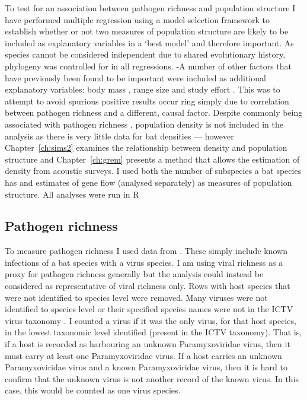 To test for an association between pathogen richness and population structure I have performed multiple regression using a model selection framework to establish whether or not two measures of population structure are likely to be included as explanatory variables in a `best model' and therefore important.
As species cannot be considered independent due to shared evolutionary history, phylogeny was controlled for in all regressions.
-A number of other factors that have previously been found to be important were included as additional explanatory variables: body mass \cite{kamiya2014determines, turmelle2009correlates, gay2014parasite, maganga2014bat, han2015infectious, bordes2008bat}, range size \cite{kamiya2014determines, turmelle2009correlates, maganga2014bat} and study effort \cite{turmelle2009correlates, gay2014parasite, maganga2014bat}.		
This was to attempt to avoid spurious positive results occur  ring simply due to correlation between pathogen richness and a different, causal factor.
Despite commonly being associated with pathogen richness \cite{arneberg2002host, kamiya2014determines, nunn2003comparative}, population density is not included in the analysis as there is very little data for bat densities --- however Chapter~\ref{ch:sims2} examines the relationship between density and population structure and Chapter~\ref{ch:grem} presents a method that allows the estimation of density from acoustic surveys.
I used both the number of subspecies a bat species has and estimates of gene flow (analysed separately) as measures of population structure.
All analyses were run in R \cite{R}

\subsection{Pathogen richness}

To measure pathogen richness I used data from \cite{luis2013comparison}. 
These simply include known infections of a bat species with a virus species. 
I am using viral richness as a proxy for pathogen richness generally but the analysis could instead be considered as representative of viral richness only.
Rows with host species that were not identified to species level were removed.
Many viruses were not identified to species level or their specified species names were not in the ICTV virus taxonomy \cite{ICTV}.
I counted a virus if it was the only virus, for that host species, in the lowest taxonomic level identified (present in the ICTV taxonomy).
That is, if a host is recorded as harbouring an unknown Paramyxoviridae virus, then it must carry at least one Paramyxoviridae virus.
If a host carries an unknown Paramyxoviridae virus and a known Paramyxoviridae virus, then it is hard to confirm that the unknown virus is not another record of the known virus.
In this case, this would be counted as one virus species.







